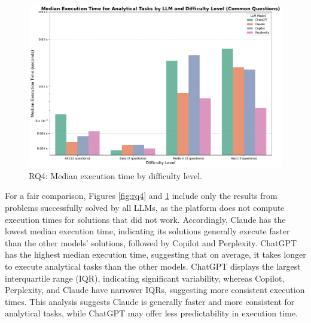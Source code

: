 \documentclass[conference]{IEEEtran}
\begin{document}
\begin{figure}[H]
    \centering
    \includegraphics[width=0.9\linewidth]{figures/results/RQ4-2-common.pdf}
    \caption{RQ4: Median execution time by difficulty level.}
    \label{fig:rq4-2}
\end{figure}

For a fair comparison, Figures \ref{fig:rq4} and \ref{fig:rq4-2} include only the results from problems successfully solved by all LLMs, as the platform does not compute execution times for solutions that did not work. Accordingly, Claude has the lowest median execution time, indicating its solutions generally execute faster than the other models' solutions, followed by Copilot and Perplexity. ChatGPT has the highest median execution time, suggesting that on average, it takes longer to execute analytical tasks than the other models. ChatGPT displays the largest interquartile range (IQR), indicating significant variability, whereas Copilot, Perplexity, and Claude have narrower IQRs, suggesting more consistent execution times. This analysis suggests Claude is generally faster and more consistent for analytical tasks, while ChatGPT may offer less predictability in execution time. 


\end{document}

